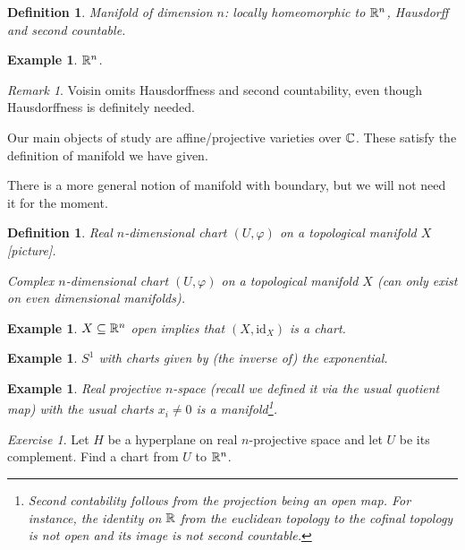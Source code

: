 \documentclass[A4paper, british]{amsart}
\theoremstyle{darkgreentheorem}
\theoremstyle{darkbluedefinition}
\newtheorem{defn}[thm]{Definition}
\theoremstyle{darkredexample}
\newtheorem{exa}[thm]{Example}
\theoremstyle{remark}
\newtheorem{rem}[thm]{Remark}
\newtheorem{exe}[thm]{Exercise}
\newcommand{\1}{\mathbbm{1}}
\newcommand{\id}{\mathrm{id}}
\begin{document}
\begin{defn}
    Manifold of dimension $n$: locally homeomorphic to $\mathbb{R}^{n}$, Hausdorff and second countable.
\end{defn}

\begin{exa}
    $\mathbb{R}^{n}$.
\end{exa}

\begin{rem}
    Voisin omits Hausdorffness and second countability, even though Hausdorffness is definitely needed.
\end{rem}

Our main objects of study are affine/projective varieties over $\mathbb{C}$.
These satisfy the definition of manifold we have given.

There is a more general notion of manifold with boundary, but we will not need it for the moment.

\begin{defn}
    Real $n$-dimensional chart $(U,\varphi)$ on a topological manifold $X$ [picture].

    Complex $n$-dimensional chart $(U,\varphi)$ on a topological manifold $X$ (can only exist on even dimensional manifolds).
\end{defn}

\begin{exa}
    $X\subseteq \mathbb{R}^{n}$ open implies that $(X,\id_{X})$ is a chart.
\end{exa}

\begin{exa}
    $S^{1}$ with charts given by (the inverse of) the exponential.
\end{exa}

\begin{exa}
    Real projective $n$-space (recall we defined it via the usual quotient map) with the usual charts $x_{i}\neq 0$ is a manifold\footnote{Second contability follows from the projection being an open map. For instance, the identity on $\mathbb{R}$ from the euclidean topology to the cofinal topology is not open and its image is not second countable.}.
\end{exa}

\begin{exe}
    Let $H$ be a hyperplane on real $n$-projective space and let $U$ be its complement.
    Find a chart from $U$ to $\mathbb{R}^{n}$.
\end{exe}
\end{document}
